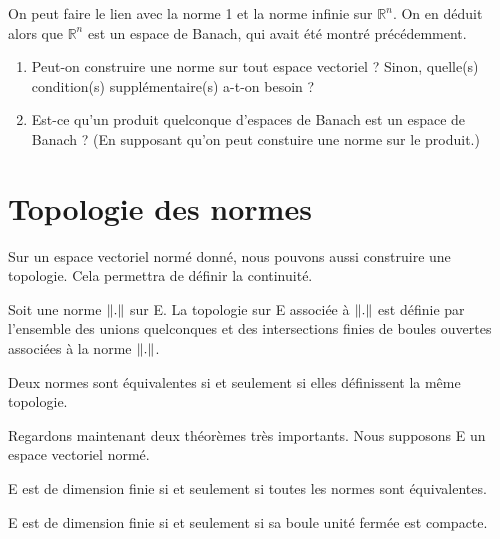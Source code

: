 \begin{exemple}
	On peut faire le lien avec la norme 1 et la norme infinie sur
	$\mathbb{R}^{n}$. On en déduit alors que $\mathbb{R}^{n}$ est un espace de
	Banach, qui avait été montré précédemment.
\end{exemple}

\begin{question}
	\begin{enumerate}
		\item Peut-on construire une norme sur tout espace vectoriel ?
			Sinon, quelle(s) condition(s) supplémentaire(s) a-t-on besoin ?
		\item Est-ce qu'un produit quelconque d'espaces de Banach est un
			espace de Banach ? (En supposant qu'on peut constuire une norme
			sur le produit.)
	\end{enumerate}
\end{question}

\section{Topologie des normes}

Sur un espace vectoriel normé donné, nous pouvons aussi construire une
topologie. Cela permettra de définir la continuité.

\begin{definition}
	Soit une norme $\norm{.}$ sur E. La topologie sur E associée à $\norm{.}$
	est définie par l'ensemble des unions quelconques et des intersections
	finies de boules ouvertes associées à la norme $\norm{.}$.
\end{definition}

\begin{proposition}
	Deux normes sont équivalentes si et seulement si elles définissent la même topologie.
\end{proposition}

Regardons maintenant deux théorèmes très importants. Nous supposons E un espace
vectoriel normé.

\begin{theorem}
	E est de dimension finie si et seulement si toutes les normes sont équivalentes.
\end{theorem}

\begin{theorem}
	\label{Riesz}
	E est de dimension finie si et seulement si sa boule unité fermée est compacte.
\end{theorem}

